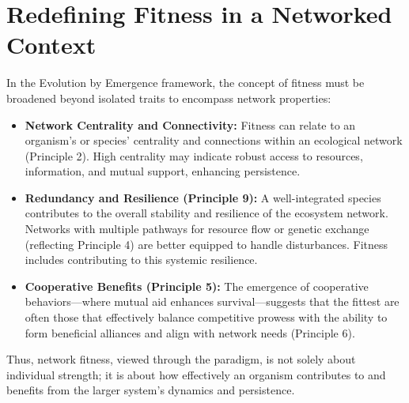 \documentclass[12pt,openany]{book}
\begin{document}
\section{Redefining Fitness in a Networked Context}
In the Evolution by Emergence framework, the concept of fitness must be broadened beyond isolated traits to encompass network properties:
\begin{itemize}
    \item \textbf{Network Centrality and Connectivity:} Fitness can relate to an organism’s or species’ centrality and connections within an ecological network (Principle 2). High centrality may indicate robust access to resources, information, and mutual support, enhancing persistence.
    \item \textbf{Redundancy and Resilience (Principle 9):} A well-integrated species contributes to the overall stability and resilience of the ecosystem network. Networks with multiple pathways for resource flow or genetic exchange (reflecting Principle 4) are better equipped to handle disturbances. Fitness includes contributing to this systemic resilience.
    \item \textbf{Cooperative Benefits (Principle 5):} The emergence of cooperative behaviors—where mutual aid enhances survival—suggests that the fittest are often those that effectively balance competitive prowess with the ability to form beneficial alliances and align with network needs (Principle 6).
\end{itemize}
Thus, network fitness, viewed through the paradigm, is not solely about individual strength; it is about how effectively an organism contributes to and benefits from the larger system's dynamics and persistence. %
\end{document}
